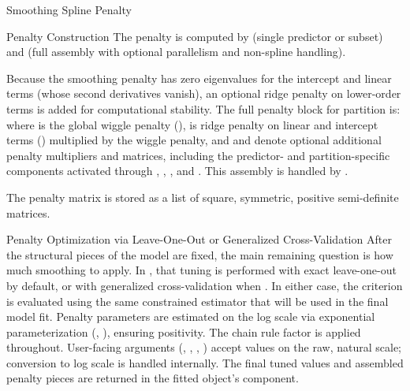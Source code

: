 \begin{Section}{Smoothing Spline Penalty}
\begin{SubSection}{Penalty Construction}
The penalty is computed by  (single
predictor or subset) and 
(full assembly with optional parallelism and non-spline handling).

Because the smoothing penalty has zero eigenvalues for the intercept and
linear terms (whose second derivatives vanish), an optional ridge penalty on
lower-order terms is added for computational stability. The full penalty
block for partition  is:
where  is the global wiggle penalty (),
 is ridge penalty on linear and intercept terms
() multiplied by the wiggle penalty, and
 and  denote optional additional
penalty multipliers and matrices, including the predictor- and
partition-specific components activated through
, ,
, and . This assembly is handled by
.

The penalty matrix \eqn{\boldsymbol{\Lambda}}{} is stored as a list
of   square, symmetric, positive semi-definite
matrices.
\end{SubSection}


%
\begin{SubSection}{Penalty Optimization via Leave-One-Out or Generalized Cross-Validation}
After the structural pieces of the model are fixed, the main remaining
question is how much smoothing to apply. In , that tuning is
performed with exact leave-one-out by default, or with generalized
cross-validation when . In either case, the
criterion is evaluated using the same constrained estimator that will be
used in the final model fit.
Penalty parameters are estimated on the log scale via exponential
parameterization (\eqn{\lambda = \exp(\theta)}{},
), ensuring positivity. The chain rule factor
\eqn{\partial\exp(\theta)/\partial\theta = \exp(\theta) = \lambda}{} is
applied throughout. User-facing arguments (,
, ,
) accept values on the raw, natural scale;
conversion to log scale is handled internally. The final tuned values and
assembled penalty pieces are returned in the fitted object's
 component.


\end{SubSection}
\end{Section}
